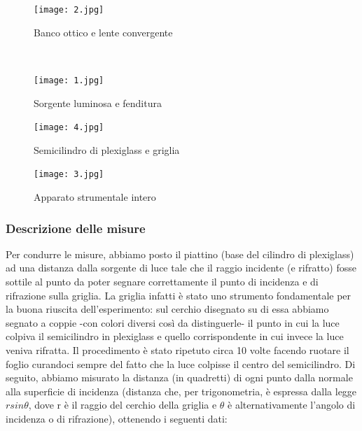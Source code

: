 \documentclass{article}
\begin{document}
\begin{figure} [H]
\begin{minipage}[b]{8.5cm}
\centering
\texttt{[image: 2.jpg]}
\caption{Banco ottico e lente convergente}
\end{minipage}
\ \hspace{2mm} \hspace{3mm} \
\begin{minipage}[b]{8.5cm}
\centering
\texttt{[image: 1.jpg]}
\caption{Sorgente luminosa e fenditura}
\end{minipage}
\end{figure}
\FloatBarrier

\begin{figure} [H]
    \centering
    \texttt{[image: 4.jpg]}
    \caption{Semicilindro di plexiglass e griglia}
    \label{fig:my_label}
\end{figure}

\begin{figure} [H]
    \centering
    \texttt{[image: 3.jpg]}
    \caption{Apparato strumentale intero}
    \label{fig:my_label}
\end{figure}

\vspace{1em}

\subsubsection{Descrizione delle misure} %
Per condurre le misure, abbiamo posto il piattino (base del cilindro di plexiglass) ad una distanza dalla sorgente di luce tale che il raggio incidente (e rifratto) fosse sottile al punto da poter segnare correttamente il punto di incidenza e di rifrazione sulla griglia. La griglia infatti è stato uno strumento fondamentale per la buona riuscita dell'esperimento: sul cerchio disegnato su di essa abbiamo segnato a coppie -con colori diversi così da distinguerle- il punto in cui la luce colpiva il semicilindro in plexiglass e quello corrispondente in cui invece la luce veniva rifratta. Il procedimento è stato ripetuto circa 10 volte facendo ruotare il foglio curandoci sempre del fatto che la luce colpisse il centro del semicilindro. Di seguito, abbiamo misurato la distanza (in quadretti) di ogni punto dalla normale alla superficie di incidenza (distanza che, per trigonometria, è espressa dalla legge $r sin \theta$, dove r è il raggio del cerchio della griglia e $\theta$ è alternativamente l'angolo di incidenza o di rifrazione), ottenendo i seguenti dati:
\end{document}
